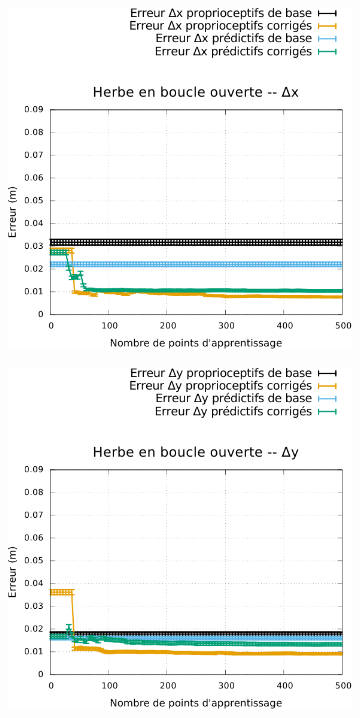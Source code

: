 \begin{figure}[htb] 
    \centerfloat
    \vspace{-0.5cm}
    \begin{subfigure}{0.29\paperwidth}
        \centering
        \includegraphics[type=pdf,ext=.pdf,read=.pdf,width=1.0\linewidth]{../plot/OdometryLWPR/grass_open_convergence_x}
    \end{subfigure}
    \begin{subfigure}{0.29\paperwidth}
        \centering
        \includegraphics[type=pdf,ext=.pdf,read=.pdf,width=1.0\linewidth]{../plot/OdometryLWPR/grass_open_convergence_y}

\end{subfigure}
\end{figure}
